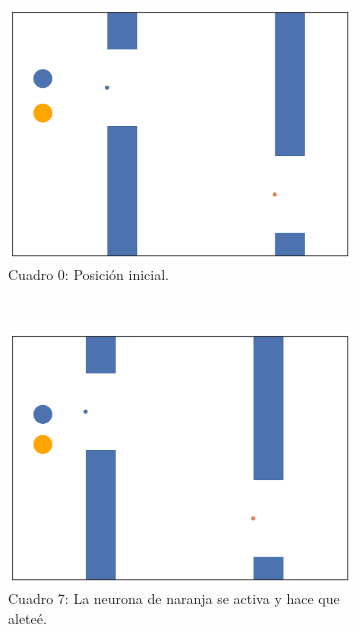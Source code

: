 \documentclass[twocolumn,spanish]{revtex4-1}
\begin{document}
\begin{figure}[t]
    \centering
    \begin{subfigure}[t]{0.25\linewidth}
        \centering
        \includegraphics[width=\linewidth]{00023.png}
        \caption{Cuadro 0: Posición inicial.}
    \end{subfigure}%
    ~\hfill
    \begin{subfigure}[t]{0.25\linewidth}
        \centering
        \includegraphics[width=\linewidth]{00030.png}
        \caption{Cuadro 7: La neurona de naranja se activa y hace que aleteé.}
    \end{subfigure}%
    ~\hfill
    \begin{subfigure}[t]{0.25\linewidth}
        \centering

\end{subfigure}
\end{figure}
\end{document}
